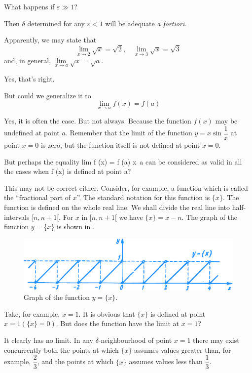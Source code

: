 {\rdr What happens if $\varepsilon \gg 1$? 

\athr Then $\delta$ determined for any $\varepsilon < 1$ will be adequate \emph{a fortiori}. 

\rdr Apparently, we may state that
\begin{equation*}%
\lim\limits_{x \to 2} \sqrt{x} = \sqrt{2}, \quad \lim\limits_{x \to 3} \sqrt{x} = \sqrt{3}
\end{equation*}
and, in general, $\lim\limits_{x \to a} \sqrt{x} = \sqrt{a}$.

\athr Yes, that's right. 

\rdr But could we generalize it to
\begin{equation*}%
\lim\limits_{x \to a} f(x) = f(a)
\end{equation*}

\athr Yes, it is often the case. But not always. Because the function $f (x)$ may be undefined at point $a$.
Remember that the limit of the function $y = x \sin \dfrac{1}{x}$ at point
$x = 0$ is zero, but the function itself is not defined at point $x = 0$.

\rdr But perhaps the equality lim f (x) = f (a) x~a
can be considered as valid in all the cases when f (x) is defined at point a?

\athr This may not be correct either. Consider, for example, a function which is called the ``fractional part of $x$''. The standard notation for this function is $\{x\}$. The function is defined on the whole real line. We shall divide the real line into half-intervals $[n, n + 1[$. For $x$ in $[n, n + 1[$ we have $\{x\} = x- n$. The graph of the function $y = \{x\}$ is shown in .

\begin{figure}[!ht]%
\centering
\includegraphics[width=\textwidth]{figures/fig-27.pdf}
\caption{Graph of the function $y = \{x\}$.}
\label{fig-27}
\end{figure}
Take, for example, $x = 1$. It is obvious that $\{x\}$ is defined at point $x = 1 (\{x\} = 0)$. But does the function have the limit at $x = 1$?

\rdr It clearly has no limit. In any $\delta$-neighbourhood of point $x = 1$ there may exist concurrently both the points at which $\{x\}$ assumes values greater than, for example, $\dfrac{2}{3}$, and the points at which $\{x\}$ assumes values less than $\dfrac{1}{3}$.

}
